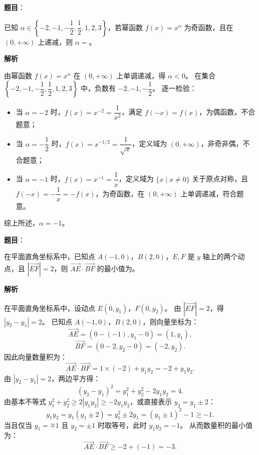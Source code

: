 \begin{answer}

\textbf{题目}：

已知 $\alpha \in \left\{-2, -1, -\dfrac{1}{2}, \dfrac{1}{2}, 1, 2, 3\right\}$，若幂函数 $f(x) = x^\alpha$ 为奇函数，且在 $(0, +\infty)$ 上递减，则 $\alpha =$\gkblank{}。

\textbf{解析}

由幂函数 $f(x) = x^\alpha$ 在 $(0, +\infty)$ 上单调递减，得 $\alpha < 0$。
在集合 $\left\{-2, -1, -\dfrac{1}{2}, \dfrac{1}{2}, 1, 2, 3\right\}$ 中，负数有 $-2, -1, -\dfrac{1}{2}$。
逐一检验：
\begin{itemize}
\item 当 $\alpha = -2$ 时，$f(x) = x^{-2} = \dfrac{1}{x^2}$，满足 $f(-x) = f(x)$，为偶函数，不合题意；
\item 当 $\alpha = -\dfrac{1}{2}$ 时，$f(x) = x^{-1/2} = \dfrac{1}{\sqrt{x}}$，定义域为 $(0, +\infty)$，非奇非偶，不合题意；
\item 当 $\alpha = -1$ 时，$f(x) = x^{-1} = \dfrac{1}{x}$，定义域为 $\{x \mid x \ne 0\}$ 关于原点对称，且 $f(-x) = -\dfrac{1}{x} = -f(x)$，为奇函数，在 $(0, +\infty)$ 上单调递减，符合题意。
\end{itemize}
综上所述，$\alpha = -1$。


\end{answer}
\begin{answer}

\textbf{题目}：

在平面直角坐标系中，已知点 $A(-1, 0)$，$B(2, 0)$，$E, F$ 是 $y$ 轴上的两个动点，且 $|\vec{EF}| = 2$，则 $\vec{AE} \cdot \vec{BF}$ 的最小值为\gkblank{}。

\textbf{解析}

在平面直角坐标系中，设动点 $E(0, y_1)$，$F(0, y_2)$。
由 $|\vec{EF}| = 2$，得 $|y_2 - y_1| = 2$。
已知点 $A(-1, 0)$，$B(2, 0)$，则向量坐标为：
\nopagebreak[4]
\[\vec{AE} = (0 - (-1), y_1 - 0) = (1, y_1),\]
\nopagebreak[4]
\[\vec{BF} = (0 - 2, y_2 - 0) = (-2, y_2).\]
因此向量数量积为：
\nopagebreak[4]
\[\vec{AE} \cdot \vec{BF} = 1 \times (-2) + y_1 y_2 = -2 + y_1 y_2.\]
由 $|y_2 - y_1| = 2$，两边平方得：
\nopagebreak[4]
\[(y_2 - y_1)^2 = y_1^2 + y_2^2 - 2y_1 y_2 = 4.\]
由基本不等式 $y_1^2 + y_2^2 \ge 2|y_1 y_2| \ge -2y_1 y_2$，或直接表示 $y_2 = y_1 \pm 2$：
\nopagebreak[4]
\[y_1 y_2 = y_1(y_1 \pm 2) = y_1^2 \pm 2y_1 = (y_1 \pm 1)^2 - 1 \ge -1.\]
当且仅当 $y_1 = \mp 1$ 且 $y_2 = \pm 1$ 时取等号，此时 $y_1 y_2 = -1$。
从而数量积的最小值为：
\nopagebreak[4]
\[\vec{AE} \cdot \vec{BF} \ge -2 + (-1) = -3.\]


\end{answer}
